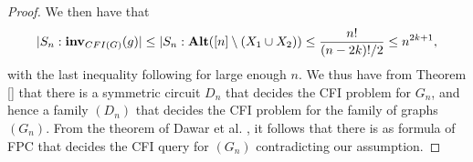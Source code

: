 \documentclass[12pt]{report}
\newcommand{\inv}{\text{\textbf{inv}}}
\newcommand{\alt}{\text{\textbf{Alt}}}
\begin{document}
\begin{proof}
  We then have that
  \begin{align*}
    \vert S_n : \inv_{CFI(G)}(g) \vert \leq \vert S_n : \alt ([n] \setminus (X_1 \cup X_2)) \leq  \frac{n!}{(n-2k)!/2} \leq n^{2k+1},
  \end{align*}
  with the last inequality following for large enough $n$. We thus
  have from Theorem \ref{} that there is a symmetric circuit $D_n$
  that decides the CFI problem for $G_n$, and hence a family $(D_n)$
  that decides the CFI problem for the family of graphs $(G_n)$. From
  the theorem of Dawar et al. \cite{}, it follows that there is as
  formula of FPC that decides the CFI query for $(G_n)$ contradicting
  our assumption.
\end{proof}
\end{document}
